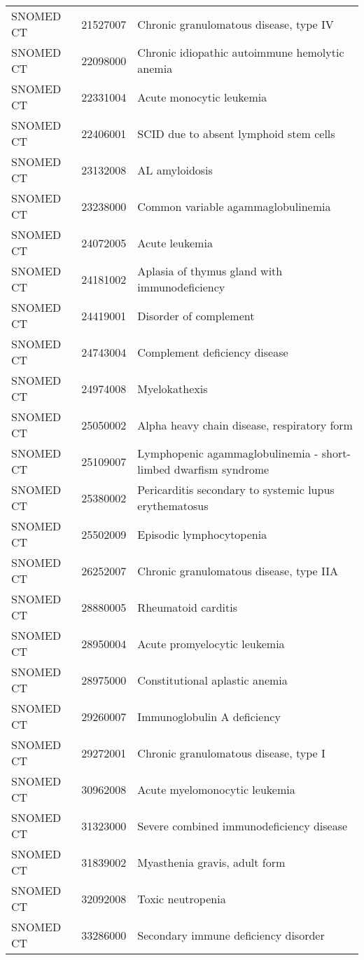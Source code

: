 \begin{table}[ht]
\begin{tabular}{lll}
  SNOMED CT & 21527007 & Chronic granulomatous disease, type IV \\ 
  SNOMED CT & 22098000 & Chronic idiopathic autoimmune hemolytic anemia \\ 
  SNOMED CT & 22331004 & Acute monocytic leukemia \\ 
  SNOMED CT & 22406001 & SCID due to absent lymphoid stem cells \\ 
  SNOMED CT & 23132008 & AL amyloidosis \\ 
  SNOMED CT & 23238000 & Common variable agammaglobulinemia \\ 
  SNOMED CT & 24072005 & Acute leukemia \\ 
  SNOMED CT & 24181002 & Aplasia of thymus gland with immunodeficiency \\ 
  SNOMED CT & 24419001 & Disorder of complement \\ 
  SNOMED CT & 24743004 & Complement deficiency disease \\ 
  SNOMED CT & 24974008 & Myelokathexis \\ 
  SNOMED CT & 25050002 & Alpha heavy chain disease, respiratory form \\ 
  SNOMED CT & 25109007 & Lymphopenic agammaglobulinemia - short-limbed dwarfism syndrome \\ 
  SNOMED CT & 25380002 & Pericarditis secondary to systemic lupus erythematosus \\ 
  SNOMED CT & 25502009 & Episodic lymphocytopenia \\ 
  SNOMED CT & 26252007 & Chronic granulomatous disease, type IIA \\ 
  SNOMED CT & 28880005 & Rheumatoid carditis \\ 
  SNOMED CT & 28950004 & Acute promyelocytic leukemia \\ 
  SNOMED CT & 28975000 & Constitutional aplastic anemia \\ 
  SNOMED CT & 29260007 & Immunoglobulin A deficiency \\ 
  SNOMED CT & 29272001 & Chronic granulomatous disease, type I \\ 
  SNOMED CT & 30962008 & Acute myelomonocytic leukemia \\ 
  SNOMED CT & 31323000 & Severe combined immunodeficiency disease \\ 
  SNOMED CT & 31839002 & Myasthenia gravis, adult form \\ 
  SNOMED CT & 32092008 & Toxic neutropenia \\ 
  SNOMED CT & 33286000 & Secondary immune deficiency disorder \\ 

\end{tabular}
\end{table}
